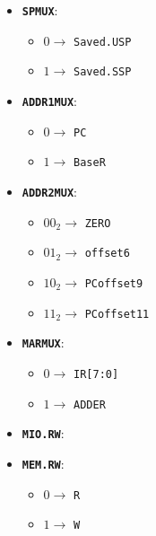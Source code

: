 \begin{minipage}{0.35\linewidth}
\Large
\begin{itemize}
    \ifio
        \item \textbf{\texttt{SPMUX}}:
            \begin{itemize}
                \item $0 \rightarrow$ \texttt{Saved.USP}
                \item $1 \rightarrow$ \texttt{Saved.SSP}
            \end{itemize}
    \else
    \fi
    \item \textbf{\texttt{ADDR1MUX}}:
        \begin{itemize}
            \item $0 \rightarrow$ \texttt{PC}
            \item $1 \rightarrow$ \texttt{BaseR}
        \end{itemize}
    \item \textbf{\texttt{ADDR2MUX}}:
        \begin{itemize}
            \item ${00}_2 \rightarrow$ \texttt{ZERO}
            \item ${01}_2 \rightarrow$ \texttt{offset6}
            \item ${10}_2 \rightarrow$ \texttt{PCoffset9}
            \item ${11}_2 \rightarrow$ \texttt{PCoffset11}
        \end{itemize}
    \ifio
        \item \textbf{\texttt{MARMUX}}:
            \begin{itemize}
                \item $0 \rightarrow$ \texttt{IR[7:0]}
                \item $1 \rightarrow$ \texttt{ADDER}
            \end{itemize}
        \item \textbf{\texttt{MIO.RW}}:
    \else
        \item \textbf{\texttt{MEM.RW}}:
    \fi
        \begin{itemize}
            \item $0 \rightarrow$ \texttt{R}
            \item $1 \rightarrow$ \texttt{W}
        \end{itemize}
\end{itemize}
\end{minipage}
